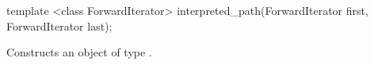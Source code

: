 %
\begin{itemdecl}
template <class ForwardIterator>
interpreted_path(ForwardIterator first, ForwardIterator last);
\end{itemdecl}
\begin{itemdescr}
\pnum
\effects
Constructs an object of type .
%
%	
\end{itemdescr}
